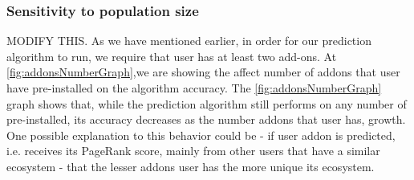 \documentclass[11pt,oneside]{book}
\let\Oldsubsubsection\subsubsection
\renewcommand{\subsubsection}{\FloatBarrier\Oldsubsubsection}
\begin{document}

\subsubsection{Sensitivity to population size}

MODIFY THIS. As we have mentioned earlier, in order for our prediction algorithm to
run, we require that user has at least two add-ons. At
\autoref{fig:addonsNumberGraph},we are showing the affect number of
addons that user have pre-installed on the algorithm accuracy. The
\autoref{fig:addonsNumberGraph} graph shows that, while the prediction
algorithm still performs on any number of pre-installed, its accuracy
decreases as the number addons that user has, growth. One possible
explanation to this behavior could be - if user addon is predicted,
i.e. receives its PageRank score, mainly from other users that have a
similar ecosystem - that the lesser addons user has the more unique
its ecosystem.
\end{document}
